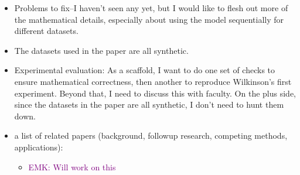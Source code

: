 \documentclass{article}
\newcommand\EMK[1]{\textcolor{purple}{EMK: #1}}
\begin{document}
\begin{itemize}
\begin{itemize}
\end{itemize}
\item Problems to fix--I haven't seen any yet, but I would like to flesh out more of the mathematical details, especially about using the model sequentially for different datasets.
\item The datasets used in the paper are all synthetic.
\item Experimental evaluation: As a scaffold, I want to do one set of checks to ensure mathematical correctness, then another to reproduce Wilkinson's first experiment. Beyond that, I need to discuss this with faculty. On the plus side, since the datasets in the paper are all synthetic, I don't need to hunt them down.
\item a list of related papers (background, followup research, competing methods,
applications):
	\begin{itemize}	
	\item \EMK{Will work on this}
	\end{itemize}
\end{itemize}
\end{document}
